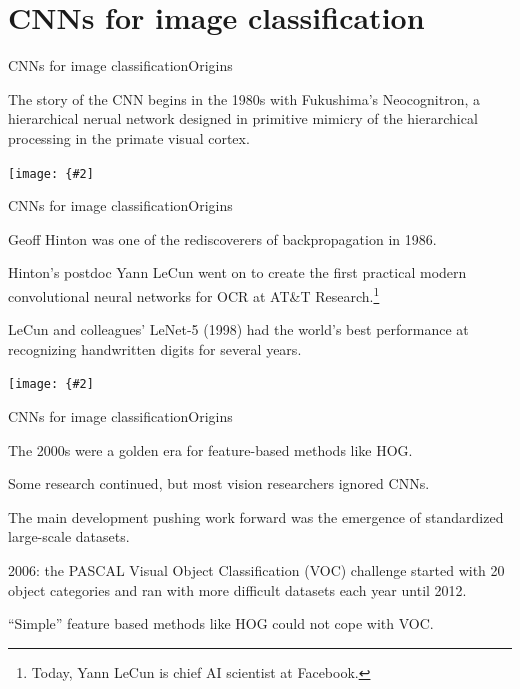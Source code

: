 \documentclass[aspectratio=169]{beamer}
\newcommand{\myfig}[3]{\centerline{\texttt{[image: \{\#2]}}}
\begin{document}
\section{CNNs for image classification}

\begin{frame}{CNNs for image classification}{Origins}

  The story of the CNN begins in the 1980s with Fukushima's
  \alert{Neocognitron}, a hierarchical nerual network designed in
  primitive mimicry of the hierarchical processing in the primate
  visual cortex.

  \medskip

  \myfig{3.5in}{fukushima-fig2}{Fukushima (1980), Fig.\ 2}

\end{frame}


\begin{frame}{CNNs for image classification}{Origins}

  Geoff Hinton was one of the rediscoverers of backpropagation in 1986.

  \medskip

  Hinton's postdoc Yann LeCun went on to create the first practical
  modern convolutional neural networks for OCR at AT\&T
  Research.\footnote{Today, Yann LeCun is chief AI scientist at
    Facebook.}

  \medskip

  LeCun and colleagues' LeNet-5 (1998) had the world's best
  performance at recognizing handwritten digits for several years.

  \medskip

  \myfig{4in}{lecun-fig2}{LeCun et al.\ (1998), Fig.\ 2}

\end{frame}


\begin{frame}{CNNs for image classification}{Origins}

  The 2000s were a golden era for feature-based methods like HOG.

  \medskip

  Some research continued, but most vision researchers ignored CNNs.

  \medskip

  The main development pushing work forward was the emergence of
  \alert{standardized large-scale datasets}.

  \medskip

  2006: the PASCAL Visual Object Classification (VOC) challenge
  started with 20 object categories and ran with more difficult
  datasets each year until 2012.

  \medskip

  ``Simple'' feature based methods like HOG could not cope with VOC.

\end{frame}
\end{document}
